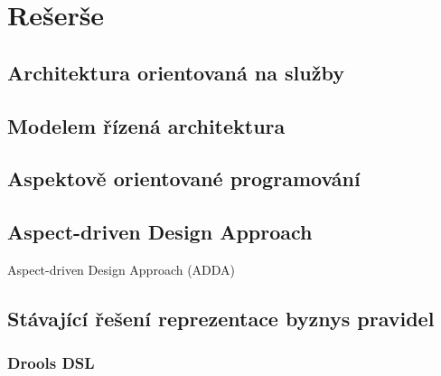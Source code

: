 
\chapter{Re\v ser\v se}\label{ch:reserse}

\section{Architektura orientovaná na služby}

\section{Modelem řízená architektura}

\section{Aspektově orientované programování}


\section{Aspect-driven Design Approach}

Aspect-driven Design Approach (ADDA)

\section{Stávající řešení reprezentace byznys pravidel}

\subsection{Drools DSL}

